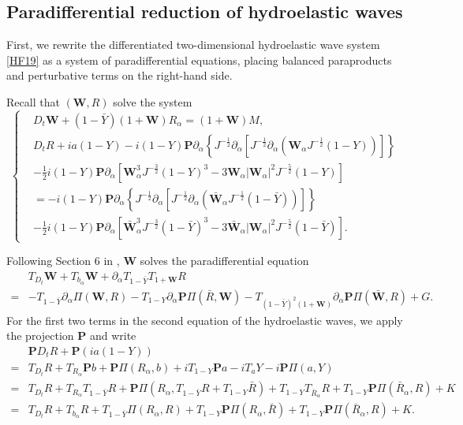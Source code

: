 \documentclass[10pt]{amsart}
\theoremstyle{remark}
\theoremstyle{definition}
\numberwithin{equation}{section}
\newcommand{\p}{\partial}
\newcommand{\al}{\alpha}
\newcommand{\f}{\frac}
\newcommand{\bw}{\mathbf{W}}
\newcommand{\nP}{{\mathbf P}}
\begin{document}
\subsection{Paradifferential reduction of hydroelastic waves} \label{s:ParaReductionHydro}
First, we rewrite the differentiated two-dimensional hydroelastic wave system \eqref{HF19} as a system of paradifferential equations, placing balanced paraproducts and perturbative terms on the right-hand side.

Recall that $(\bw, R)$ solve the system 
 \begin{equation*}
 \begin{cases}
&D_t\mathbf{W}+(1-\bar{Y})(1+\mathbf{W})R_{\al}=(1+\mathbf{W})M,\\
&D_tR+ia(1-Y) -i(1-Y) \nP \p_\al\left\{J^{-\f12}\p_\al\left[J^{-\f12}\p_\al\left(\mathbf{W}_{\al}J^{-\f12}(1-Y)\right)\right]\right\}\\
&
-\f12i(1-Y) \nP \p_\al\left[\mathbf{W}^3_{\al}J^{-\f32}(1-Y)^3-3\mathbf{W}_{\al}|\mathbf{W}_{\al}|^2 J^{-\f52}(1-Y)\right]\\
&=-i(1-Y)\nP \p_{\al}\left\{J^{-\f12}\p_\al\left[J^{-\f12}\p_\al\left(\bar{\mathbf{W}}_{\al}
J^{-\f12}(1-\bar{Y})\right)\right]\right\}\\
&-\f12i(1-Y) \nP \p_{\al}\left[\bar{\mathbf{W}}^3_{\al}J^{-\f32}(1-\bar{Y})^3-3\bar{\mathbf{W}}_{\al}|\mathbf{W}_{\al}|^2 J^{-\f52}(1-\bar{Y})\right].
\end{cases}
\end{equation*}

Following Section 6 in \cite{AIT}, $\bw$ solves the paradifferential equation
\begin{equation} \label{WParaEqn}
\begin{aligned}
&T_{D_t}\bw + T_{b_\alpha}\bw + \partial_\alpha T_{1-\bar{Y}}T_{1+\bw} R \\
=& - T_{1- \bar{Y}}\p_\al \Pi(\bw, R)- T_{1-Y}\partial_\alpha \nP \Pi( \bar{R}, \bw) -T_{(1-\bar{Y})^2(1+\bw)}\partial_\alpha \nP\Pi(\bar{\bw}, R) + G.
\end{aligned}    
\end{equation}
For the first two terms in the second equation of the hydroelastic waves, we apply the projection $\nP$ and write
\begin{align*}
 &\nP D_tR + \nP(ia(1-Y))\\
 =&   T_{D_t} R + T_{R_\alpha} \nP b + \nP\Pi(R_\alpha, b)+ iT_{1-Y} \nP a -iT_a Y -i\nP \Pi(a,Y)\\
          =&    T_{D_t} R + T_{R_\alpha} T_{1-\bar{Y}}R +\nP\Pi(R_\alpha, T_{1-\bar{Y}}R + T_{1-Y}\bar{R})+ T_{1-Y}T_{\bar{R}_\alpha}R +T_{1-Y}\nP\Pi(\bar{R}_\alpha, R) +K\\
 =&  T_{D_t} R + T_{b_\al} R + T_{1-\bar{Y}}\Pi(R_\alpha, R) + T_{1-Y}\nP \Pi( R_\al, \bar{R}) +T_{1-Y}\nP\Pi(\bar{R}_\alpha, R) + K.
\end{align*}
\end{document}
